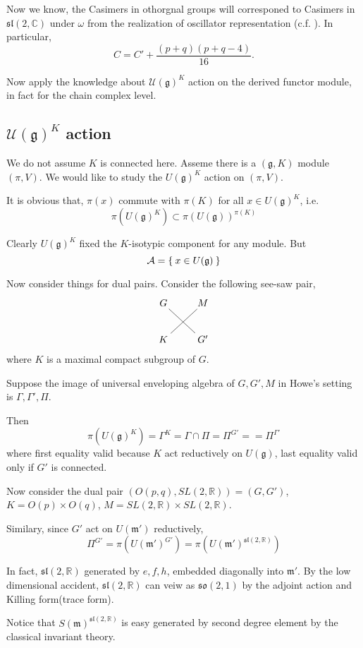 \documentclass[12pt]{article}
\makeatletter
\def\bR{{\mathbb{R}}}
\def\bC{{\mathbb{C}}}
\def\asl{\mathfrak{sl}}
\def\aso{\mathfrak{so}}
\def\fgg{\mathfrak{g}}
\def\caa{\mathcal{A}}
\def\cuu{\mathcal{U}}
\def\fmm{\mathfrak{m}}
\def\seesawpair#1#2#3#4{
\xymatrix{
{#1} \ar@{-}[dr]& {#2} \\
{#3} \ar@{-}[ur] & {#4}}
}
\makeatother
\begin{document}
Now we know, the Casimers in othorgnal groups will corresponed to Casimers 
in $\asl(2,\bC)$ under $\omega$ 
from the realization of oscillator representation (c.f. \cite{Howe1979Opq}).
In particular, 
\[
C = C' + \frac{(p+q)(p+q-4)}{16}.
\]

Now apply the knowledge about $\cuu(\fgg)^K$ action on 
the derived functor module, in fact for the chain complex level.



\subsection{$\cuu(\fgg)^K$ action}
We do not assume $K$ is connected here.  
Asseme there is a $(\fgg,K)$ module $(\pi,V)$.
We would like to study the $U(\fgg)^K$ action on $(\pi,V)$. 

It is obvious that, 
$\pi(x)$ commute with $\pi(K)$ for all $x \in U(\fgg)^K$, i.e. 
\[
\pi(U(\fgg)^K) \subset \pi(U(\fgg))^{\pi(K)}
\]


Clearly $U(\fgg)^K$ fixed the $K$-isotypic component for any module.
But 
\[
\caa =\Set{x\in U(\fgg)}
\]

Now consider things for dual pairs.
Consider the following see-saw pair, 
\[
\seesawpair{G}{M}{K}{G'}
\]
where $K$ is a maximal compact subgroup of $G$. 

Suppose the image of universal enveloping algebra of $G,G',M$
in Howe's setting \cite{Howe1989Rem} is $\Gamma,\Gamma', \Pi$.

Then
\[
\pi(U(\fgg)^K) = \Gamma^K = \Gamma \cap \Pi = \Pi^{G'} ==\Pi^{\Gamma'}
\]
where first equality valid because $K$ act reductively on $U(\fgg)$,
last equality valid only if $G'$ is connected.


Now consider the dual pair $(O(p,q),SL(2,\bR))=(G,G')$,
$K = O(p)\times O(q)$, $M=SL(2,\bR) \times SL(2,\bR)$.

Similary, since $G'$ act on $U(\fmm')$ reductively, 
\[
\Pi^{G'} = \pi(U(\fmm')^{G'}) = \pi(U(\fmm')^{\asl(2,\bR)})
\]

In fact, $\asl(2,\bR)$ generated by $e,f,h$, embedded diagonally into 
$\fmm'$. 
By the low dimensional accident, $\asl(2,\bR)$ can veiw as $\aso(2,1)$
by the adjoint action and Killing form(trace form). 

Notice that $S(\fmm)^{\asl(2,\bR)}$ is easy generated by second degree element
by the classical invariant theory. 
 
\end{document}
